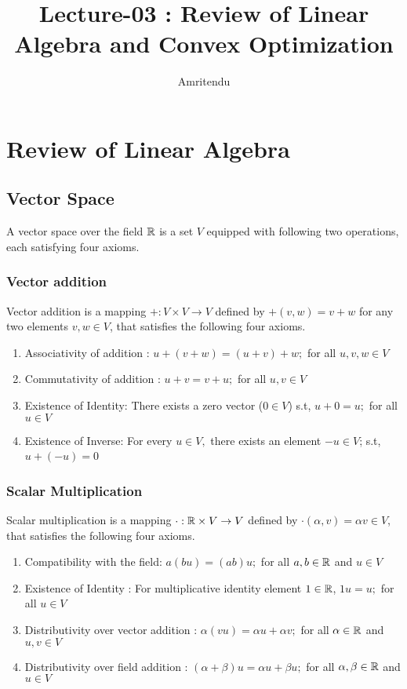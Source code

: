 \documentclass[a4paper,english,12pt]{article}
\title{Lecture-03 : Review of Linear Algebra and Convex Optimization}
\author{Amritendu}
\begin{document}
\maketitle
\section{Review of Linear Algebra}
\subsection{Vector Space}
A vector space over the field $\mathbb{R}$ is a set $V$ equipped with following two operations, each satisfying four axioms. 
\subsubsection{Vector addition}
Vector addition is a mapping $+: V \times V \to V$ defined by $+(v,w) = v+w$ for any two elements $v,w \in V$, 
that satisfies the following four axioms. 
\begin{enumerate}
\item Associativity of  addition : $u + (v + w) = (u + v) + w; $ for all $ u,v,w \in V$
\item Commutativity of addition : $u + v = v + u;  $ for all $ u,v \in V$
\item Existence of Identity: There exists a zero vector ($0 \in V$) s.t, $u+0=u; $ for all $ u\in V$
\item Existence of Inverse: For every $u \in V,$ there exists an element $-u\in V$; s.t, $u+(-u)=0$\
\end{enumerate}
\subsubsection{Scalar Multiplication}
Scalar multiplication is a mapping $\cdot : \mathbb{R} \times V \to V$ defined by $\cdot(\alpha, v) = \alpha v \in V$, 
that satisfies the following four axioms. 
\begin{enumerate}
\item Compatibility with the field: $a(bu)=(ab)u; $ for all $ a,b \in \mathbb{R}$ and $u\in V$
\item Existence of Identity : For multiplicative identity element $1 \in \mathbb{R}$, $1u=u; $ for all $ u\in V$
\item Distributivity over vector addition : $\alpha(vu)=\alpha u + \alpha v; $ for all $ \alpha \in \mathbb{R}$ and $u,v \in V$ 
\item Distributivity over field addition : $(\alpha+\beta)u=\alpha u + \beta u; $ for all $ \alpha,\beta \in \mathbb{R}$ and $u \in V$ 
\end{enumerate}
\end{document}
